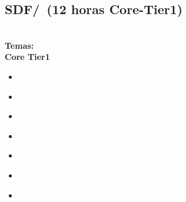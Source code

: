 \subsection{SDF/\SDFFundamentalDataStructures~(12 horas Core-Tier1)}\label{sec:BOK:SDFFundamentalDataStructures}
\SDFFundamentalDataStructuresDescription\\
\noindent \textbf{Temas:}\\
\noindent \textbf{Core Tier1}
\begin{itemize}
	\item \SDFFundamentalDataStructuresTopicArrays\label{sec:BOK:SDFFundamentalDataStructuresTopicArrays}
	\item \SDFFundamentalDataStructuresTopicRecords\label{sec:BOK:SDFFundamentalDataStructuresTopicRecords}
	\item \SDFFundamentalDataStructuresTopicStrings\label{sec:BOK:SDFFundamentalDataStructuresTopicStrings}
	\item \SDFFundamentalDataStructuresTopicAbstract\label{sec:BOK:SDFFundamentalDataStructuresTopicAbstract}
	\item \SDFFundamentalDataStructuresTopicReferences\label{sec:BOK:SDFFundamentalDataStructuresTopicReferences}
	\item \SDFFundamentalDataStructuresTopicLinked\label{sec:BOK:SDFFundamentalDataStructuresTopicLinked}
	\item \SDFFundamentalDataStructuresTopicStrategies\label{sec:BOK:SDFFundamentalDataStructuresTopicStrategies}
\end{itemize}


